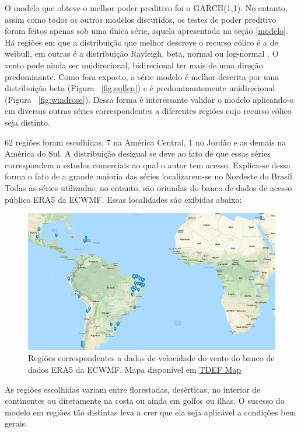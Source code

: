 \documentclass[
	12pt,				%
	openright,			%
	oneside,			%
	a4paper,			%
	english,			%
	french,				%
	spanish,			%
	brazil				%
	]{abntex2}
\begin{document}
O modelo que obteve o melhor poder preditivo foi o GARCH(1,1). No entanto, assim como todos os outros modelos discutidos, os testes  de poder preditivo foram feitos apenas sob uma única série, aquela apresentada na seção \ref{modelo}. Há regiões em que a distribuição que melhor descreve o recurso eólico é  a de weibull, em outras é a distribuição Rayleigh, beta, normal ou log-normal \cite{dists}. O vento pode ainda ser unidirecional, bidirecional ter mais de uma direção predominante. Como fora exposto, a série modelo é melhor descrita por uma distribuição beta (Figura ~\ref{fig:cullen}) e é predominantemente unidirecional (Figura ~\ref{fig:windrose}). Dessa forma é interessante validar o modelo aplicando-o em diversas outras séries correspondentes a diferentes regiões cujo recurso eólico seja distinto. 

62 regiões foram escolhidas. 7 na América Central, 1 no Jordão e as demais na América do Sul. A distribuição desigual se deve ao fato de que essas séries correspondem a estudos comerciais ao qual o autor tem acesso. Explica-se dessa forma o fato de a grande maioria das séries localizarem-se no Nordeste do Brasil. Todas as séries utilizadas, no entanto, são oriundas do banco de dados de acesso público ERA5 da ECWMF. Essas localidades são exibidas abaixo:

\begin{figure}[h]
    \centering
	\includegraphics[width=\textwidth]{latam}
	\caption{Regiões correspondentes a dados de velocidade do vento do banco de dados ERA5 da ECWMF. Mapa disponível em \href{https://drive.google.com/open?id=1BhnfX52bhdIj7LbBzX_KbzbSS-oIQXiD&usp=sharing}{TDEF Map}}
\end{figure}
\FloatBarrier

As regiões escolhidas variam entre florestadas, desérticas, no interior de continentes ou diretamente na costa ou ainda em golfos ou ilhas. O sucesso do modelo em regiões tão distintas leva a crer que ela seja aplicável a condições bem gerais.
\end{document}

